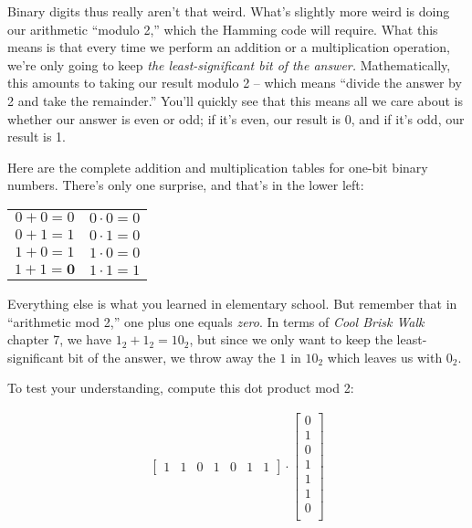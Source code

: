 \begin{alttitles}

Binary digits thus really aren't that weird. What's slightly more weird is
doing our arithmetic ``modulo 2,'' which the Hamming code will require. What
this means is that every time we perform an addition or a multiplication
operation, we're only going to keep \textit{the least-significant bit of the
answer.} Mathematically, this amounts to taking our result modulo 2 -- which
means ``divide the answer by 2 and take the remainder.'' You'll quickly see
that this means all we care about is whether our answer is even or odd; if it's
even, our result is 0, and if it's odd, our result is 1.

Here are the complete addition and multiplication tables for one-bit binary
numbers. There's only one surprise, and that's in the lower left:

\vspace{-.15in}
\begin{center}
\setlength{\tabcolsep}{40pt}
\begin{tabular}{cc}
$0+0 = 0$ & $0\cdot 0 = 0$ \\
$0+1 = 1$ & $0\cdot 1 = 0$ \\
$1+0 = 1$ & $1\cdot 0 = 0$ \\
$1+1 = \textbf{0}$ & $1\cdot 1 = 1$ \\
\end{tabular}
\end{center}
\vspace{-.15in}

Everything else is what you learned in elementary school. But remember that in
``arithmetic mod 2,'' one plus one equals \textit{zero}. In terms of
\textit{Cool Brisk Walk} chapter 7, we have $1_2 + 1_2 = 10_2$, but since we
only want to keep the least-significant bit of the answer, we throw away the
$1$ in $10_2$ which leaves us with $0_2$.

To test your understanding, compute this dot product mod 2:

\vspace{-.15in}
\begin{align*}
\begin{bmatrix}
1 & 1 & 0 & 1 & 0 & 1 & 1
\end{bmatrix} \cdot
\begin{bmatrix}
0 \\ 1 \\ 0 \\ 1 \\ 1 \\ 1 \\ 0 \\
\end{bmatrix}
\end{align*}
\vspace{-.15in}


\end{alttitles}
